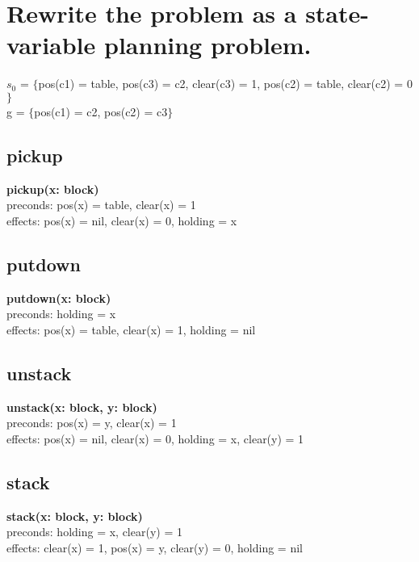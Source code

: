 \documentclass[paper=a4, fontsize=11pt]{scrartcl} %
\numberwithin{equation}{section} %
\numberwithin{figure}{section} %
\numberwithin{table}{section} %
\begin{document}
\section{Rewrite the problem as a state-variable planning problem.}
$s_0$ = $\{$pos(c1) = table, pos(c3) = c2, clear(c3) = 1, pos(c2) = table, clear(c2) = 0 $\}$\\
g = $\{$pos(c1) = c2, pos(c2) = c3$\}$

\subsection{pickup}
\textbf{pickup(x: block)}\\
preconds: pos(x) = table, clear(x) = 1\\
effects: pos(x) = nil, clear(x) = 0, holding = x\\

\subsection{putdown}

\textbf{putdown(x: block)}\\
preconds: holding = x\\
effects: pos(x) = table, clear(x) = 1, holding = nil\\

\subsection{unstack}

\textbf{unstack(x: block, y: block)}\\
preconds: pos(x) = y, clear(x) = 1\\
effects: pos(x) = nil, clear(x) = 0, holding = x, clear(y) = 1\\

\subsection{stack}

\textbf{stack(x: block, y: block)}\\
preconds: holding = x, clear(y) = 1\\
effects: clear(x) = 1, pos(x) = y, clear(y) = 0, holding = nil\\
\end{document}
